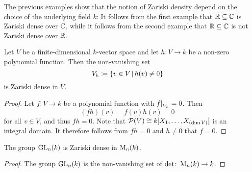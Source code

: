 \begin{warning}
  The previous examples show that the notion of Zariski density depend on the choice of the underlying field $k$:
  It follows from the first example that $\mathbb{R} \subseteq \mathbb{C}$ is Zariski dense over $\mathbb{C}$, while it follows from the second example that $\mathbb{R} \subseteq \mathbb{C}$ is not Zariski dense over $\mathbb{R}$.
\end{warning}


\begin{lemma}
  Let $V$ be a finite-dimensional $k$-vector space and let $h \colon V \to k$ be a non-zero polynomial function.
  Then the non-vanishing set
  \[
              V_h
    \coloneqq \{
                v \in V
              \suchthat
                h(v) \neq 0
              \}
  \]
  is Zariski dense in $V$.
\end{lemma}
\begin{proof}
  Let $f \colon V \to k$ be a polynomial function with $\restrict{f}{V_h} = 0$.
  Then
  \[
      (fh)(v)
    = f(v)h(v)
    = 0
  \]
  for all $v \in V$, and thus $fh = 0$.
  Note that $\mathcal{P}(V) \cong k[X_1, \dotsc, X_{(\dim V)}]$ is an integral domain.
  It therefore follows from $fh = 0$ and $h \neq 0$ that $f = 0$.
\end{proof}


\begin{corollary}
  \label{corollary: GLn is Zariski dense in Mn}
  The group $\operatorname{GL}_n(k)$ is Zariski dense in $\operatorname{M}_n(k)$.
\end{corollary}
\begin{proof}
  The group $\operatorname{GL}_n(k)$ is the non-vanishing set of $\det \colon \operatorname{M}_n(k) \to k$.
\end{proof}


